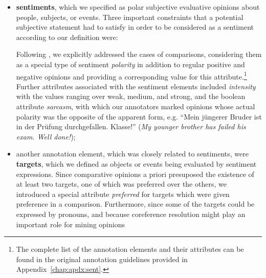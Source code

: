\begin{itemize}
\item
  \textbf{sentiments}, which we specified as polar subjective
  evaluative opinions about people, subjects, or events.  Three
  important constraints that a potential subjective statement had to
  satisfy in order to be considered as a sentiment according to our
  definition were:

  Following \citet{Jindal:06a,Jindal:06b}, we explicitly addressed the
  cases of comparisons, considering them as a special type of
  sentiment \emph{polarity} in addition to regular positive and
  negative opinions and providing a corresponding value for this
  attribute.\footnote{The complete list of the annotation elements and
    their attributes can be found in the original annotation
    guidelines provided in Appendix~\ref{chap:apdx:sent}.}  Further
  attributes associated with the sentiment elements included
  \emph{intensity} with the values ranging over weak, medium, and
  strong, and the boolean attribute \emph{sarcasm}, with which our
  annotators marked opinions whose actual polarity was the opposite of
  the apparent form, e.g. ``Mein j\"ungerer Bruder ist in der
  Pr\"ufung durchgefallen.  Klasse!''  (\textit{My younger brother has
    failed his exam.  Well done!});

\item another annotation element, which was closely related to
  sentiments, were \textbf{targets}, which we defined as objects or
  events being evaluated by sentiment expressions.  Since comparative
  opinions a priori presuposed the existence of at least two targets,
  one of which was preferred over the others, we introduced a special
  attribute \emph{preferred} for targets which were given preference
  in a comparison.  Furthermore, since some of the targets could be
  expressed by pronouns, and because coreference resolution might play
  an important role for mining opinions \cite{Stoyanov:06,Ding:10}
\end{itemize}


